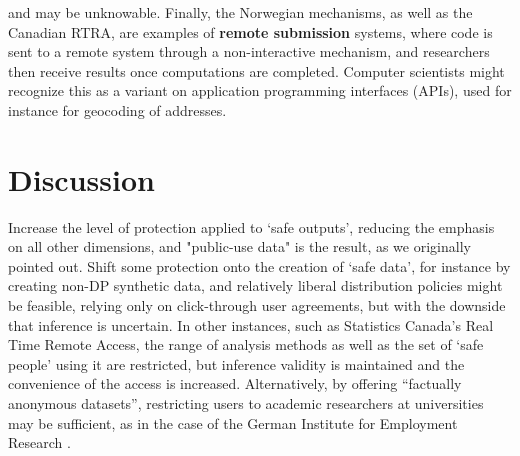 and may be unknowable. Finally, the Norwegian mechanisms, as well as the Canadian RTRA, are examples of \textbf{remote submission} systems, where code is sent to a remote system through a non-interactive mechanism, and researchers then receive results once computations are completed. Computer scientists might recognize this as a variant on application programming interfaces (APIs), used for instance for geocoding of addresses. 





\section{Discussion}

Increase the level of protection applied to `safe outputs', reducing the emphasis on all other dimensions, and "public-use data" is the result, as we originally pointed out. Shift some protection onto the creation of  `safe data', for instance by creating non-DP synthetic data, and relatively liberal distribution policies might be feasible, relying only on click-through user agreements, but with the downside that inference is uncertain. In other instances, such as Statistics Canada's Real Time Remote Access, the range of analysis methods as well as the set of `safe people' using it are restricted,  but inference validity is maintained and the convenience of the access is increased. Alternatively, by offering ``factually anonymous datasets'', restricting users to academic researchers at universities may be sufficient, as in the case of the German Institute for Employment Research \cite{forschungsdatenzentrum_der_ba_im_iab_scientific_nodate}.

